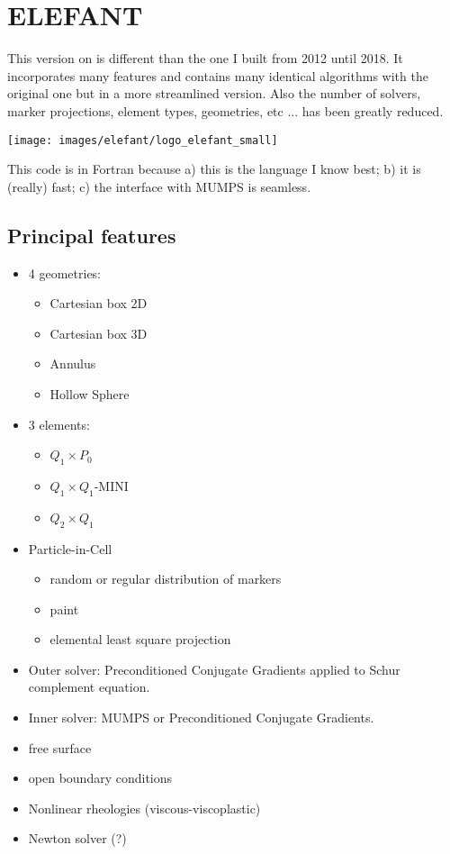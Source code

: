 \chapter{ELEFANT} %

This version on \elefant is different than the one I built from 2012 until 2018.
It incorporates many features and contains many identical algorithms with the original 
one but in a more streamlined version. Also the number of solvers, marker projections, 
element types, geometries, etc ... has been greatly reduced. 

\begin{center}
\texttt{[image: images/elefant/logo\_elefant\_small]}
\end{center}

This code is in Fortran because a) this is the language I know best; b) it is (really) fast;
c) the interface with MUMPS is seamless.  

\section{Principal features}

\begin{itemize}
\item 4 geometries:
\begin{itemize}
\item Cartesian box 2D
\item Cartesian box 3D
\item Annulus
\item Hollow Sphere
\end{itemize}
\item 3 elements:
\begin{itemize}
\item $Q_1\times P_0$
\item $Q_1\times Q_1$-MINI
\item $Q_2\times Q_1$
\end{itemize}
\item Particle-in-Cell
\begin{itemize}
\item random or regular distribution of markers
\item paint  
\item elemental least square projection
\end{itemize}
\item Outer solver: Preconditioned Conjugate Gradients applied to Schur complement equation.
\item Inner solver: MUMPS or Preconditioned Conjugate Gradients.
\item free surface
\item open boundary conditions
\item Nonlinear rheologies (viscous-viscoplastic)
\item Newton solver (?)
\end{itemize}

